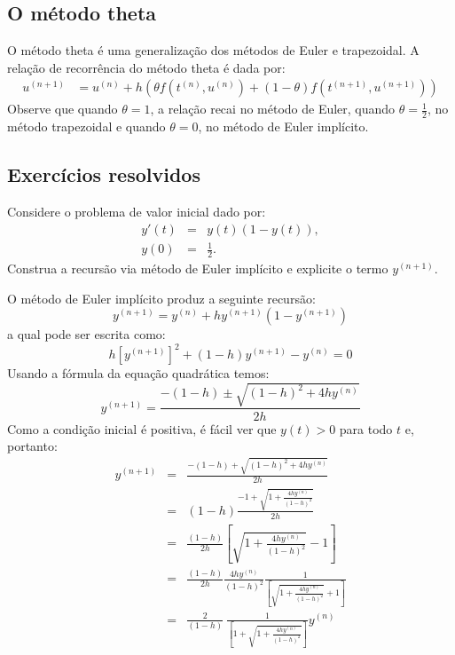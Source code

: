 \subsection{O método theta}
O método theta é uma generalização dos métodos de Euler e trapezoidal. A relação de recorrência do método theta é dada por:
\begin{eqnarray}
  u^{(n+1)} &= u^{(n)} +  h (\theta f(t^{(n)},u^{(n)})+(1-\theta )f(t^{(n+1)},u^{(n+1)}))
\end{eqnarray}
Observe que quando $\theta =1$, a relação recai no método de Euler, quando $\theta =\frac{1}{2}$, no método trapezoidal e quando $\theta=0$, no método de Euler implícito.


\subsection*{Exercícios resolvidos}

\begin{exeresol}
 Considere o problema de valor inicial dado por:
 \begin{eqnarray}
  y'(t)&=&y(t)\left(1-y(t)\right),\\
  y(0)&=&\frac{1}{2}.
 \end{eqnarray}
Construa a recursão via método de Euler implícito e explicite o termo $y^{(n+1)}$.
\end{exeresol}
\begin{resol}
 O método de Euler implícito produz a seguinte recursão:
 \begin{equation} y^{(n+1)}=y^{(n)}+h y^{(n+1)}\left(1-y^{(n+1)}\right) \end{equation}
 a qual pode ser escrita como:
 \begin{equation} h\left[y^{(n+1)}\right]^2+ (1-h)y^{(n+1)}-y^{(n)}=0 \end{equation}
 Usando a fórmula da equação quadrática temos:
 \begin{equation} y^{(n+1)}= \frac{-(1-h)\pm \sqrt{(1-h)^2+4hy^{(n)}}}{2h} \end{equation}
Como a condição inicial é positiva, é fácil ver que $y(t)>0$ para todo $t$ e, portanto:
 \begin{eqnarray}
y^{(n+1)}&=& \frac{-(1-h)+ \sqrt{(1-h)^2+4hy^{(n)}}}{2h}\\
&=&  (1-h) \frac{-1+ \sqrt{1+ \frac{4hy^{(n)}}{(1-h)^2} }}{2h}\\
&=&  \frac{(1-h)}{2h} \left[\sqrt{1+ \frac{4hy^{(n)}}{(1-h)^2} }-1\right]\\
&=&  \frac{(1-h)}{2h} \frac{4hy^{(n)}}{(1-h)^2} \frac{1}{\left[\sqrt{1+ \frac{4hy^{(n)}}{(1-h)^2} }+1\right]}\\
&=&  \frac{2}{(1-h)} \ \frac{1}{\left[1+\sqrt{1+ \frac{4hy^{(n)}}{(1-h)^2} }\right]}y^{(n)}\\
 \end{eqnarray}
\end{resol}

